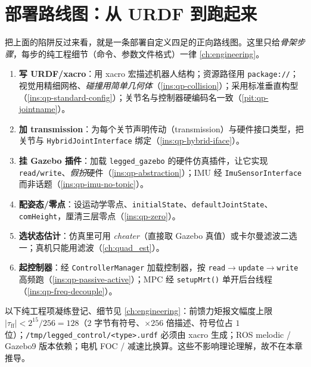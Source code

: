 \section{部署路线图：从 URDF 到跑起来}
\label{sec:qp-deploy}

把上面的陷阱反过来看，就是一条部署自定义四足的正向路线图。这里只给\emph{骨架步骤}，每步的纯工程细节（命令、参数文件格式）一律 \cref{ch:engineering}。

\begin{enumerate}
  \item \textbf{写 URDF/xacro}：用 xacro 宏描述机器人结构；资源路径用 \texttt{package://}；视觉用精细网格、\emph{碰撞用简单几何体}（\cref{ins:qp-collision}）；采用标准垂直构型（\cref{ins:qp-standard-config}）；关节名与控制器硬编码名一致（\cref{pit:qp-jointname}）。
  \item \textbf{加 transmission}：为每个关节声明传动（transmission）与硬件接口类型，把关节与 \texttt{HybridJointInterface} 绑定（\cref{ins:qp-hybrid-iface}）。
  \item \textbf{挂 Gazebo 插件}：加载 \texttt{legged\_gazebo} 的硬件仿真插件，让它实现 \texttt{read/write}、\emph{假扮}硬件（\cref{ins:qp-abstraction}）；IMU 经 \texttt{ImuSensorInterface} 而非话题（\cref{ins:qp-imu-no-topic}）。
  \item \textbf{配姿态/零点}：设运动学零点、\texttt{initialState}、\texttt{defaultJointState}、\texttt{comHeight}，厘清三层零点（\cref{ins:qp-zero}）。
  \item \textbf{选状态估计}：仿真里可用 \emph{cheater}（直接取 Gazebo 真值）或卡尔曼滤波二选一；真机只能用滤波（\cref{ch:quad_est}）\cite{sleiman2021unified}。
  \item \textbf{起控制器}：经 \texttt{ControllerManager} 加载控制器，按 \texttt{read}$\to$\texttt{update}$\to$\texttt{write} 高频跑（\cref{ins:qp-passive-active}）；MPC 经 \texttt{setupMrt()} 单开后台线程（\cref{ins:qp-freq-decouple}）。
\end{enumerate}

\begin{note}\label{note:qp-eng}
以下纯工程项凝练登记、细节见 \cref{ch:engineering}：前馈力矩报文幅度上限 $|\tau_{\mathrm{ff}}|<2^{15}/256=128$（$2$ 字节有符号、$\times256$ 倍描述、符号位占 $1$ 位）\cite{unitree2023quadruped}；\texttt{/tmp/legged\_control/<type>.urdf} 必须由 xacro 生成；ROS melodic / Gazebo9 版本依赖；电机 FOC / 减速比换算。这些不影响理论理解，故不在本章推导。
\end{note}

